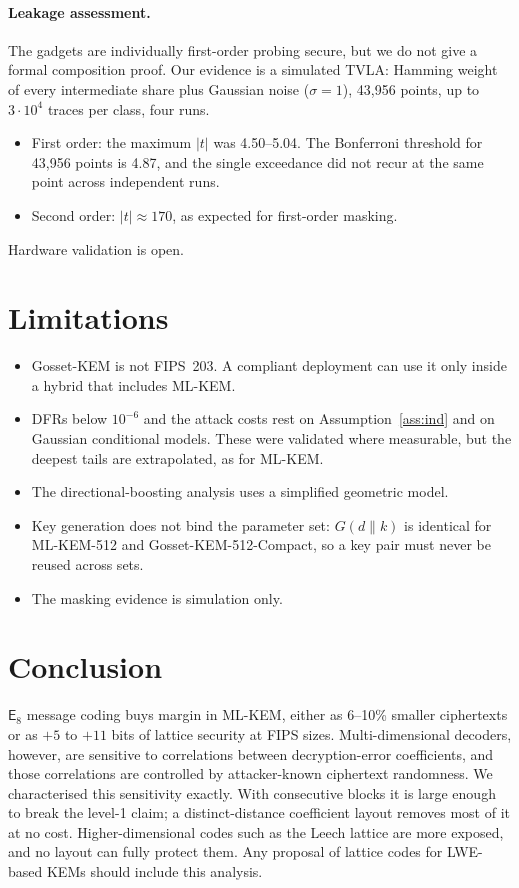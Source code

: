 \documentclass[11pt,a4paper]{article}
\theoremstyle{definition}
\theoremstyle{remark}
\newcommand{\E}{\mathsf{E}_8}
\begin{document}
\paragraph{Leakage assessment.} The gadgets are individually first-order probing secure, but we do not give a formal composition proof. Our evidence is a simulated TVLA: Hamming weight of every intermediate share plus Gaussian noise ($\sigma=1$), 43{,}956 points, up to $3\cdot10^4$ traces per class, four runs.
\begin{itemize}[leftmargin=*,itemsep=1pt]
\item First order: the maximum $|t|$ was 4.50--5.04. The Bonferroni threshold for 43{,}956 points is 4.87, and the single exceedance did not recur at the same point across independent runs.
\item Second order: $|t|\approx170$, as expected for first-order masking.
\end{itemize}
Hardware validation is open.

\section{Limitations}
\begin{itemize}[leftmargin=*,itemsep=1pt]
\item Gosset-KEM is not FIPS~203. A compliant deployment can use it only inside a hybrid that includes ML-KEM.
\item DFRs below $10^{-6}$ and the attack costs rest on Assumption~\ref{ass:ind} and on Gaussian conditional models. These were validated where measurable, but the deepest tails are extrapolated, as for ML-KEM.
\item The directional-boosting analysis uses a simplified geometric model.
\item Key generation does not bind the parameter set: $G(d\|k)$ is identical for ML-KEM-512 and Gosset-KEM-512-Compact, so a key pair must never be reused across sets.
\item The masking evidence is simulation only.
\end{itemize}

\section{Conclusion}
$\E$ message coding buys margin in ML-KEM, either as 6--10\% smaller ciphertexts or as $+5$ to $+11$ bits of lattice security at FIPS sizes. Multi-dimensional decoders, however, are sensitive to correlations between decryption-error coefficients, and those correlations are controlled by attacker-known ciphertext randomness. We characterised this sensitivity exactly. With consecutive blocks it is large enough to break the level-1 claim; a distinct-distance coefficient layout removes most of it at no cost. Higher-dimensional codes such as the Leech lattice are more exposed, and no layout can fully protect them. Any proposal of lattice codes for LWE-based KEMs should include this analysis.
\end{document}
